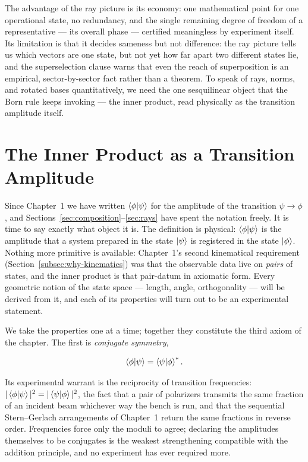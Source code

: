 The advantage of the ray picture is its economy: one mathematical point for one operational state, no redundancy, and the single remaining degree of freedom of a representative --- its overall phase --- certified meaningless by experiment itself. Its limitation is that it decides sameness but not difference: the ray picture tells us which vectors are one state, but not yet how far apart two different states lie, and the superselection clause warns that even the reach of superposition is an empirical, sector-by-sector fact rather than a theorem. To speak of rays, norms, and rotated bases quantitatively, we need the one sesquilinear object that the Born rule keeps invoking --- the inner product, read physically as the transition amplitude itself.

\section{The Inner Product as a Transition Amplitude}
\label{sec:innerproduct}

Since Chapter~1 we have written $\braket{\phi|\psi}$ for the amplitude of the transition $\psi\to\phi$, and Sections~\ref{sec:composition}--\ref{sec:rays} have spent the notation freely. It is time to say exactly what object it is. The definition is physical: $\braket{\phi|\psi}$ is the amplitude that a system prepared in the state $\ket{\psi}$ is registered in the state $\ket{\phi}$. Nothing more primitive is available: Chapter~1's second kinematical requirement (Section~\ref{subsec:why-kinematics}) was that the observable data live on \emph{pairs} of states, and the inner product is that pair-datum in axiomatic form. Every geometric notion of the state space --- length, angle, orthogonality --- will be derived from it, and each of its properties will turn out to be an experimental statement.

We take the properties one at a time; together they constitute the third axiom of the chapter. The first is \emph{conjugate symmetry},
\begin{linenomath}
\begin{equation}
    \braket{\phi|\psi}=\braket{\psi|\phi}^{*} .
    \label{eq:ip-conjugate}
\end{equation}
\end{linenomath}
Its experimental warrant is the reciprocity of transition frequencies: $|\braket{\phi|\psi}|^2=|\braket{\psi|\phi}|^2$, the fact that a pair of polarizers transmits the same fraction of an incident beam whichever way the bench is run, and that the sequential Stern--Gerlach arrangements of Chapter~1 return the same fractions in reverse order. Frequencies force only the moduli to agree; declaring the amplitudes themselves to be conjugates is the weakest strengthening compatible with the addition principle, and no experiment has ever required more.

